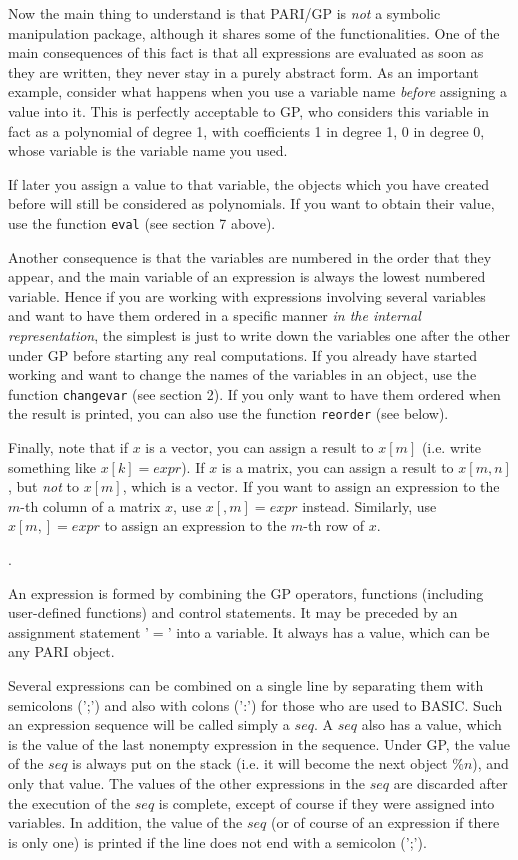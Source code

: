 Now the main thing to understand is that PARI/GP is {\sl not} a symbolic manipulation
package, although it shares some of the functionalities. One of the main consequences
of this fact is that all expressions are evaluated as soon as they are written, they
never stay in a purely abstract form. As an important example, consider what happens
when you use a variable name {\sl before} assigning a value into it. This is perfectly
acceptable to GP, who considers this variable in fact as a polynomial of degree 1, with
coefficients 1 in degree 1, 0 in degree 0, whose variable is the variable name you used.

If later you assign a value to that variable, the objects which you have created before
will still be considered as polynomials. If you want to obtain their value, use the
function {\tt eval} (see section 7 above).

Another consequence is that the variables are numbered in the order
that they appear, and the main variable of an expression is always
the lowest numbered variable. Hence if you are working with expressions
involving several variables and want to have them ordered in a specific manner
{\sl in the internal representation}, the simplest is just to write down the variables
one after the other under GP before starting any real computations.
If you already have started working and want to change the names of the variables
in an object, use the function {\tt changevar} (see section 2). If you only want
to have them ordered when the result is printed, you can also use the function
{\tt reorder} (see below).

Finally, note that if $x$ is a vector, you can assign a result to $x[m]$ (i.e. write
something like $x[k]=expr$). If $x$ is a matrix, you can assign a result to $x[m,n]$, but {\sl not} to $x[m]$, which is a vector. If you want to assign an
expression to the $m$-th column of a matrix $x$, use $x[,m]=expr$ instead. Similarly, use $x[m,]=expr$ to assign an expression to the $m$-th row of $x$.

.

An expression is formed by combining the GP operators, functions (including user-defined
functions) and control statements. It may be preceded by an assignment statement '$=$'
into a variable. It always has a value, which can be any PARI object.

Several expressions can be combined on a single line by separating them with semicolons
(';') and also with colons (':') for those who are used to BASIC. Such an expression
sequence will be called simply a $seq$. A $seq$ also has a value, which is the value
of the last nonempty expression in the sequence. Under GP, the value of the $seq$ is
always put on the stack (i.e. it will become the next object $\%n$), and only that value.
The values of the other expressions in the $seq$ are discarded after the execution of
the $seq$ is complete, except of course if they were assigned into variables.
In addition, the value of the $seq$ (or of course of an expression if there is only one)
is printed if the line does not end with a semicolon (';').

